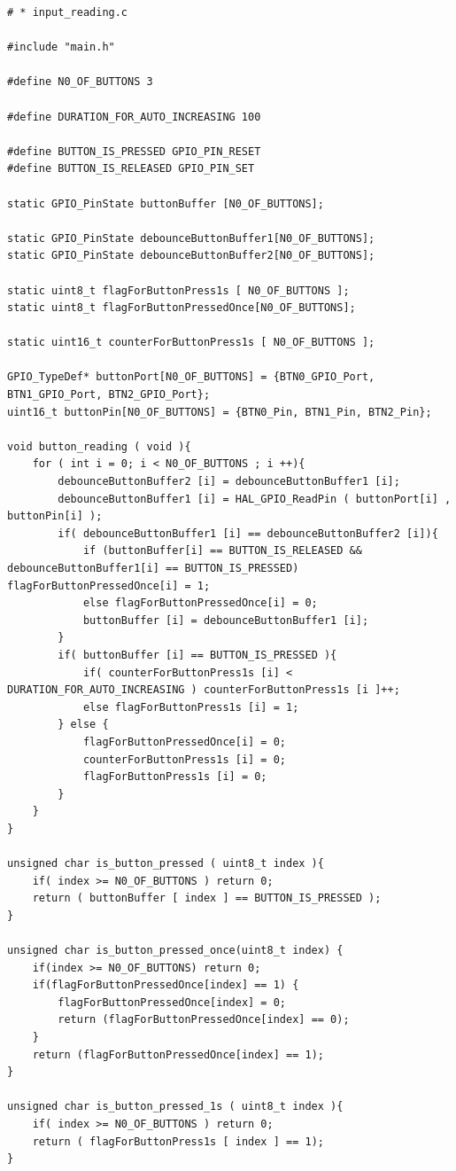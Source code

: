 \documentclass[a4paper,12pt]{article}
\begin{document}
\begin{lstlisting}
# * input_reading.c	
	
#include "main.h"

#define N0_OF_BUTTONS 3

#define DURATION_FOR_AUTO_INCREASING 100

#define BUTTON_IS_PRESSED GPIO_PIN_RESET
#define BUTTON_IS_RELEASED GPIO_PIN_SET

static GPIO_PinState buttonBuffer [N0_OF_BUTTONS];

static GPIO_PinState debounceButtonBuffer1[N0_OF_BUTTONS];
static GPIO_PinState debounceButtonBuffer2[N0_OF_BUTTONS];

static uint8_t flagForButtonPress1s [ N0_OF_BUTTONS ];
static uint8_t flagForButtonPressedOnce[N0_OF_BUTTONS];

static uint16_t counterForButtonPress1s [ N0_OF_BUTTONS ];

GPIO_TypeDef* buttonPort[N0_OF_BUTTONS] = {BTN0_GPIO_Port, BTN1_GPIO_Port, BTN2_GPIO_Port};
uint16_t buttonPin[N0_OF_BUTTONS] = {BTN0_Pin, BTN1_Pin, BTN2_Pin};

void button_reading ( void ){
	for ( int i = 0; i < N0_OF_BUTTONS ; i ++){
		debounceButtonBuffer2 [i] = debounceButtonBuffer1 [i];
		debounceButtonBuffer1 [i] = HAL_GPIO_ReadPin ( buttonPort[i] , buttonPin[i] );
		if( debounceButtonBuffer1 [i] == debounceButtonBuffer2 [i]){
			if (buttonBuffer[i] == BUTTON_IS_RELEASED && debounceButtonBuffer1[i] == BUTTON_IS_PRESSED) flagForButtonPressedOnce[i] = 1;
			else flagForButtonPressedOnce[i] = 0;
			buttonBuffer [i] = debounceButtonBuffer1 [i];
		}
		if( buttonBuffer [i] == BUTTON_IS_PRESSED ){
			if( counterForButtonPress1s [i] < DURATION_FOR_AUTO_INCREASING ) counterForButtonPress1s [i ]++;
			else flagForButtonPress1s [i] = 1;
		} else {
			flagForButtonPressedOnce[i] = 0;
			counterForButtonPress1s [i] = 0;
			flagForButtonPress1s [i] = 0;
		}
	}
}

unsigned char is_button_pressed ( uint8_t index ){
	if( index >= N0_OF_BUTTONS ) return 0;
	return ( buttonBuffer [ index ] == BUTTON_IS_PRESSED );
}

unsigned char is_button_pressed_once(uint8_t index) {
	if(index >= N0_OF_BUTTONS) return 0;
	if(flagForButtonPressedOnce[index] == 1) {
		flagForButtonPressedOnce[index] = 0;
		return (flagForButtonPressedOnce[index] == 0);
	}
	return (flagForButtonPressedOnce[index] == 1);
}

unsigned char is_button_pressed_1s ( uint8_t index ){
	if( index >= N0_OF_BUTTONS ) return 0;
	return ( flagForButtonPress1s [ index ] == 1);
}
\end{lstlisting}
\end{document}
